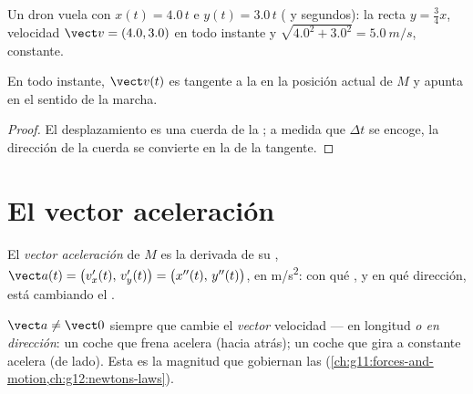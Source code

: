 \begin{example}\label{ex:g12:kinematics-2d:drone}
Un dron vuela con $x(t) = 4.0\,t$ e $y(t) = 3.0\,t$ ( y
segundos):  la recta $y = \tfrac34 x$, velocidad
$\vect v = (4.0, 3.0)$ en todo instante y 
$\sqrt{4.0^2 + 3.0^2} = \qty{5.0}{m/s}$, constante.
\end{example}

\begin{proposition}\label{prop:g12:kinematics-2d:tangent}
En todo instante, $\vect v(t)$ es tangente a la  en la
posición actual de $M$ y apunta en el sentido de la marcha.
\end{proposition}

\begin{proof}
El desplazamiento es una cuerda de la ; a medida que
$\Delta t$ se encoge, la dirección de la cuerda se convierte en la de la
tangente.
\end{proof}

\section{El vector aceleración}

\begin{definition}\label{def:g12:kinematics-2d:acceleration}
El \emph{vector aceleración} de $M$ es la
derivada de su ,
$\vect a(t) = \bigl(v_x'(t),\, v_y'(t)\bigr) =
\bigl(x''(t),\, y''(t)\bigr)$, en \unit{m/s^2}: con qué , y en
qué dirección, está cambiando el .
\end{definition}

\begin{remark}\label{rem:g12:kinematics-2d:turning}
$\vect a \neq \vect 0$ siempre que cambie el \emph{vector} velocidad ---
en longitud \emph{o en dirección}: un coche que frena acelera (hacia
atrás); un coche que gira a  constante acelera (de lado). Esta es
la magnitud que gobiernan las 
(\cref{ch:g11:forces-and-motion,ch:g12:newtons-laws}).
\end{remark}

